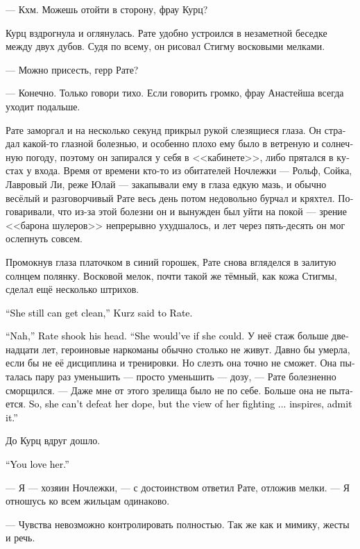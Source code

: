 \documentclass[a4paper,12pt,fleqn]{book}\usepackage{cooltooltips}\usepackage{polyglossia}\setdefaultlanguage[babelshorthands=true]{russian}\setotherlanguage{english}\defaultfontfeatures{Ligatures=TeX,Mapping=tex-text} \usepackage{xcolor}\definecolor{lightgray}{HTML}{bbbbbb}\color{lightgray}\newcommand{\ml}[3]{\textenglish{\textcolor{black}{#3}}}
\begin{document}
--- Кхм.
Можешь отойти в сторону, фрау Курц?

Курц вздрогнула и оглянулась.
Рате удобно устроился в незаметной беседке между двух дубов.
Судя по всему, он рисовал Стигму восковыми мелками.

--- Можно присесть, герр Рате?

--- Конечно.
Только говори тихо.
Если говорить громко, фрау Анастейша всегда уходит подальше.

Рате заморгал и на несколько секунд прикрыл рукой слезящиеся глаза.
Он страдал какой-то глазной болезнью, и особенно плохо ему было в ветреную и солнечную погоду, поэтому он запирался у себя в <<кабинете>>, либо прятался в кустах у входа.
Время от времени кто-то из обитателей Ночлежки --- Рольф, Сойка, Лавровый Ли, реже Юлай --- закапывали ему в глаза едкую мазь, и обычно весёлый и разговорчивый Рате весь день потом недовольно бурчал и кряхтел. %
Поговаривали, что из-за этой болезни он и вынужден был уйти на покой --- зрение <<барона шулеров>> непрерывно ухудшалось, и лет через пять-десять он мог ослепнуть совсем.

Промокнув глаза платочком в синий горошек, Рате снова вгляделся в залитую солнцем полянку.
Восковой мелок, почти такой же тёмный, как кожа Стигмы, сделал ещё несколько штрихов.

\ml{$0$}
{--- Она ещё может выбраться, --- сказала Курц Рате.}
{``She still can get clean,'' Kurz said to Rate.}

\ml{$0$}
{--- Неа, --- покачал головой Рате.}
{``Nah,'' Rate shook his head.}
\ml{$0$}
{--- Могла бы --- выбралась.}
{``She would've if she could.}
У неё стаж больше двенадцати лет, героиновые наркоманы обычно столько не живут.
Давно бы умерла, если бы не её дисциплина и тренировки.
Но слезть она точно не сможет.
Она пыталась пару раз уменьшить --- просто уменьшить --- дозу, --- Рате болезненно сморщился.
--- Даже мне от этого зрелища было не по себе.
Больше она не пытается.
\ml{$0$}
{Так что наркоту ей не победить, но смотреть, как она борется... признай, воодушевляет.}
{So, she can't defeat her dope, but the view of her fighting ... inspires, admit it.''}

До Курц вдруг дошло.

\ml{$0$}
{--- Ты её любишь.}
{``You love her.''}

--- Я --- хозяин Ночлежки, --- с достоинством ответил Рате, отложив мелки.
--- Я отношусь ко всем жильцам одинаково.

--- Чувства невозможно контролировать полностью.
Так же как и мимику, жесты и речь.
\end{document}
